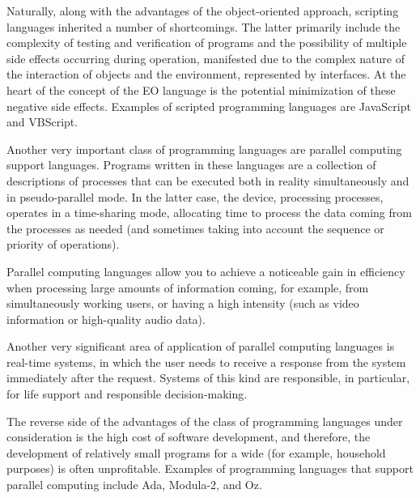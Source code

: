 \documentclass[12pt]{book}
\begin{document}
Naturally, along with the advantages of the object-oriented approach, scripting languages inherited a number of shortcomings. The latter primarily include the complexity of testing and verification of programs and the possibility of multiple side effects occurring during operation, manifested due to the complex nature of the interaction of objects and the environment, represented by interfaces. At the heart of the concept of the EO language is the potential minimization of these negative side effects. Examples of scripted programming languages are JavaScript and  VBScript.

Another very important class of programming languages are parallel computing support languages. Programs written in these languages are a collection of descriptions of processes that can be executed both in reality simultaneously and in pseudo-parallel mode. In the latter case, the device, processing processes, operates in a time-sharing mode, allocating time to process the data coming from the processes as needed (and sometimes taking into account the sequence or priority of operations).

Parallel computing languages allow you to achieve a noticeable gain in efficiency when processing large amounts of information coming, for example, from simultaneously working users, or having a high intensity (such as video information or high-quality audio data).

Another very significant area of application of parallel computing languages is real-time systems, in which the user needs to receive a response from the system immediately after the request. Systems of this kind are responsible, in particular, for life support and responsible decision-making.

The reverse side of the advantages of the class of programming languages under consideration is the high cost of software development, and therefore, the development of relatively small programs for a wide (for example, household purposes) is often unprofitable.
Examples of programming languages that support parallel computing include Ada, Modula-2, and Oz.
\end{document}
